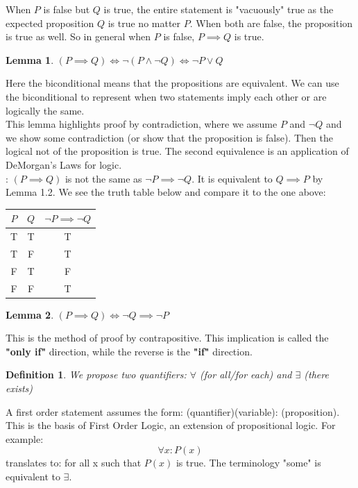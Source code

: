 \documentclass{article}
\newtheorem{lem}{Lemma}[section]
\newtheorem{defn}{Definition}[section]
\begin{document}
\indent When $P$ is false but $Q$ is true, the entire statement is "vacuously" true as the expected proposition $Q$ is true no matter $P$. When both are false, the proposition is true as well. So in general when $P$ is false, $P \implies Q$ is true.\\

\begin{lem}
    $(P \implies Q) \iff \lnot(P \land \lnot Q) \iff \lnot P \lor Q$
\end{lem}
Here the biconditional means that the propositions are equivalent. We can use the biconditional to represent when two statements imply each other or are logically the same.\\

This lemma highlights proof by contradiction, where we assume $P$ and $\lnot Q$ and we show some contradiction (or show that the proposition is false). Then the logical not of the proposition is true. The second equivalence is an application of DeMorgan's Laws for logic.\\

: $(P \implies Q)$ is not the same as $\lnot P \implies \lnot Q$. It is equivalent to $Q \implies P$ by Lemma 1.2. We see the truth table below and compare it to the one above:
\begin{center}
\begin{tabular}{| c | c  | c |}
\hline
$P$ & $Q$ & $\lnot P \implies \lnot Q$ \\
\hline
T & T & T\\
T & F & T\\
F & T & F\\
F & F & T\\
\hline
\end{tabular}
\end{center}

\medskip
\begin{lem}
    $(P \implies Q) \iff \lnot Q \implies \lnot P$
\end{lem}
This is the method of proof by contrapositive. This implication is called the \textbf{"only if"} direction, while the reverse is the \textbf{"if"} direction.\\

\begin{defn}
    We propose two quantifiers: $\forall$ (for all/for each) and $\exists$ (there exists)
\end{defn}
A first order statement assumes the form: (quantifier)(variable): (proposition). This is the basis of First Order Logic, an extension of propositional logic. For example:
\begin{equation*}
    \forall x : P(x)
\end{equation*}
translates to: for all x such that $P(x)$ is true. The terminology "some" is equivalent to $\exists$.\\
\end{document}

